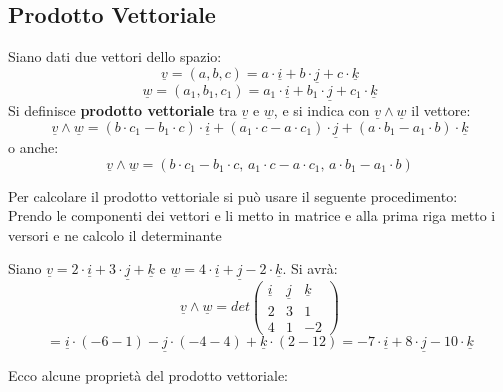\documentclass[a4paper,12pt, oneside]{book}
\begin{document}
\subsection{Prodotto Vettoriale}
\begin{definizione}
	Siano dati due vettori dello spazio:
	$$\underline{v}=(a,b,c)=a\cdot \underline{i}+b\cdot \underline{j}+c\cdot \underline{k}$$
	$$\underline{w}=(a_1,b_1,c_1)=a_1\cdot \underline{i}+b_1\cdot \underline{j}+c_1\cdot \underline{k}$$
	Si definisce \textbf{prodotto vettoriale} tra $\underline{v}$ e $\underline{w}$, e si indica con $\underline{v}\land\underline{w}$ il vettore:
	$$\underline{v}\land\underline{w}=(b\cdot c_1-b_1\cdot c)\cdot \underline{i}+(a_1\cdot c-a\cdot c_1)\cdot\underline{j}+(a\cdot b_1-a_1\cdot b)\cdot \underline{k}$$
	o anche:
	$$\underline{v}\land\underline{w}=(b\cdot c_1-b_1\cdot c,\,a_1\cdot c-a\cdot c_1,\,a\cdot b_1-a_1\cdot b)$$
\end{definizione}
\begin{nota}
	Per calcolare il prodotto vettoriale si può usare il seguente procedimento:\\
	Prendo le componenti dei vettori e li metto in matrice e alla prima riga metto i versori e ne calcolo il determinante
	\begin{esempio}
		Siano $\underline{v}=2\cdot \underline{i}+3\cdot \underline{j}+ \underline{k}$ e $\underline{w}=4\cdot \underline{i}+ \underline{j}-2\cdot \underline{k}$. Si avrà:
		$$
			\underline{v}\land\underline{w}=det\left(\begin{matrix}
					\underline{i} & \underline{j} & \underline{k} \\
					2             & 3             & 1             \\
					4             & 1             & -2
				\end{matrix}\right)
		$$
		$$=\underline{i}\cdot (-6-1)-\underline{j}\cdot (-4-4)+\underline{k}\cdot(2-12)=-7\cdot \underline{i}+8\cdot \underline{j}-10\cdot \underline{k}$$
	\end{esempio}
\end{nota}
\newpage
Ecco alcune proprietà del prodotto vettoriale:
\end{document}

